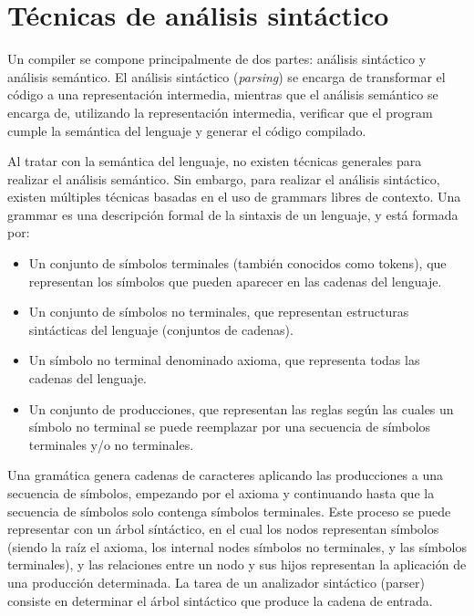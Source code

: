 \FloatBarrier

\section{Técnicas de análisis sintáctico}\label{sec:parser-techniques}

Un \gls{compiler} se compone principalmente de dos partes: análisis sintáctico y
análisis semántico. El análisis sintáctico (\textit{parsing}) se encarga de
transformar el código a una representación intermedia, mientras que el análisis
semántico se encarga de, utilizando la representación intermedia, verificar que
el \gls{program} cumple la semántica del lenguaje y generar el código compilado.
\parencite{dragon-book}

Al tratar con la semántica del lenguaje, no existen técnicas generales para
realizar el análisis semántico. Sin embargo, para realizar el análisis
sintáctico, existen múltiples técnicas basadas en el uso de \glspl{grammar}
libres de contexto. Una \gls{grammar} es una descripción formal de la sintaxis
de un lenguaje, y está formada por: \parencite{dragon-book}

\begin{itemize}
    \item Un conjunto de símbolos terminales (también conocidos como
    \glspl{token}), que representan los símbolos que pueden aparecer en las
    cadenas del lenguaje.
    \item Un conjunto de símbolos no terminales, que representan estructuras
    sintácticas del lenguaje (conjuntos de cadenas).
    \item Un símbolo no terminal denominado axioma, que representa todas las
    cadenas del lenguaje.
    \item Un conjunto de producciones, que representan las reglas según las
    cuales un símbolo no terminal se puede reemplazar por una secuencia de
    símbolos terminales y/o no terminales.
\end{itemize}

Una gramática genera cadenas de caracteres aplicando las producciones a una
secuencia de símbolos, empezando por el axioma y continuando hasta que la
secuencia de símbolos solo contenga símbolos terminales. Este proceso se puede
representar con un árbol síntáctico, en el cual los nodos representan símbolos
(siendo la raíz el axioma, los \glspl{internal node} símbolos no terminales, y
las  símbolos terminales), y las relaciones entre un
nodo y sus hijos representan la aplicación de una producción determinada. La
tarea de un analizador sintáctico (\gls{parser}) consiste en determinar el árbol
sintáctico que produce la cadena de entrada. \parencite{dragon-book}

